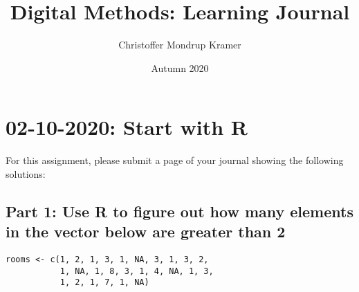 \documentclass{article}
\title{Digital Methods: Learning Journal}
\author{Christoffer Mondrup Kramer}
\date{Autumn 2020}
\begin{document}
\maketitle
\pagebreak{}

\tableofcontents
\pagebreak{}

\section{02-10-2020: Start with R}
For this assignment, please submit a page of your journal showing the following solutions:
\subsection{Part 1: Use R to figure out how many elements in the vector below are greater than 2} 
\begin{verbatim}
rooms <- c(1, 2, 1, 3, 1, NA, 3, 1, 3, 2, 
           1, NA, 1, 8, 3, 1, 4, NA, 1, 3,
           1, 2, 1, 7, 1, NA)
\end{verbatim}
\end{document}
